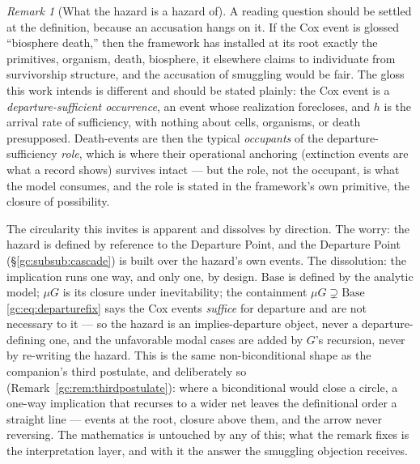\documentclass[11pt]{article}
\numberwithin{equation}{section}
\theoremstyle{plain}
\theoremstyle{definition}
\theoremstyle{remark}
\newtheorem{remark}[theorem]{Remark}
\begin{document}
\begin{remark}[What the hazard is a hazard of]\label{gr1:rem:hazardof}
A reading question should be settled at the definition, because an
accusation hangs on it. If the Cox event is glossed ``biosphere
death,'' then the framework has installed at its root exactly the
primitives, organism, death, biosphere, it elsewhere claims to
individuate from survivorship structure, and the accusation of
smuggling would be fair. The gloss this work intends is different and
should be stated plainly: the Cox event is a \emph{departure-sufficient
occurrence}, an event whose realization forecloses, and $h$ is
the arrival rate of sufficiency, with nothing about cells, organisms,
or death presupposed. Death-events are then the typical
\emph{occupants} of the departure-sufficiency \emph{role}, which is
where their operational anchoring (extinction events are what a record
shows) survives intact --- but the role, not the occupant, is what the
model consumes, and the role is stated in the framework's own
primitive, the closure of possibility.

The circularity this invites is apparent and dissolves by direction.
The worry: the hazard is defined by reference to the Departure Point,
and the Departure Point (\S\ref{gc:subsub:cascade}) is built over the
hazard's own events. The dissolution: the implication runs one way,
and only one, by design. $\mathrm{Base}$ is defined by the analytic
model; $\mu G$ is its closure under inevitability; the containment
$\mu G\supsetneq\mathrm{Base}$ \eqref{gc:eq:departurefix} says the
Cox events \emph{suffice} for departure and are not necessary to it
--- so the hazard is an implies-departure object, never a
departure-defining one, and the unfavorable modal cases are added by
$G$'s recursion, never by re-writing the hazard. This is the same
non-biconditional shape as the companion's third postulate, and
deliberately so (Remark~\ref{gc:rem:thirdpostulate}): where a
biconditional would close a circle, a one-way implication that
recurses to a wider net leaves the definitional order a straight line
--- events at the root, closure above them, and the arrow never
reversing. The mathematics is untouched by any of this; what the
remark fixes is the interpretation layer, and with it the answer the
smuggling objection receives.
\end{remark}
\end{document}
